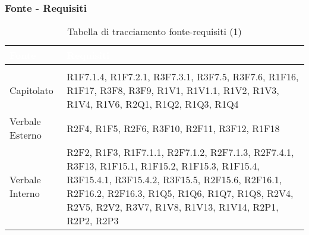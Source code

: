 \subsubsection{Fonte - Requisiti}
\renewcommand{\arraystretch}{1.5}
{
\setlength\arrayrulewidth{0.8pt}
\begin{longtable}{C{3cm} | C{12cm}}
		\textcolor{white}{\textbf{Fonte}} & 
		\textcolor{white}{\textbf{Requisiti}}\\
		\endfirsthead
	    \\
	    \endfoot
	    \caption{Tabella di tracciamento fonte-requisiti (1)}
	    \endlastfoot


Capitolato &  	R1F7.1.4, R1F7.2.1, R3F7.3.1, R3F7.5, R3F7.6, R1F16, R1F17, R3F8, R3F9, R1V1, R1V1.1, R1V2, R1V3, R1V4, R1V6, R2Q1, R1Q2, R1Q3, R1Q4 \\

Verbale Esterno & R2F4, R1F5, R2F6, R3F10, R2F11, R3F12, R1F18 \\

Verbale Interno & 	R2F2, R1F3, R1F7.1.1, R2F7.1.2, R2F7.1.3, R2F7.4.1, R3F13, R1F15.1, R1F15.2, R1F15.3, R1F15.4, R3F15.4.1, R3F15.4.2, R3F15.5, R2F15.6, R2F16.1, R2F16.2, R2F16.3, R1Q5, R1Q6, R1Q7, R1Q8, R2V4, R2V5, R2V2, R3V7, R1V8, R1V13, R1V14, R2P1, R2P2, R2P3 \\

\end{longtable}
}

